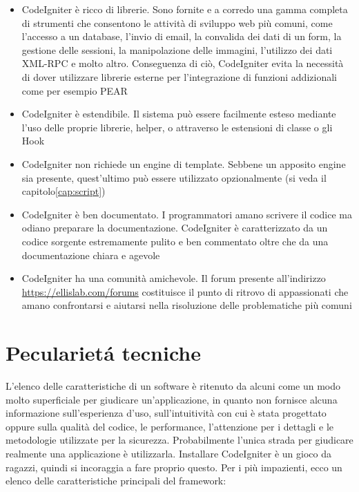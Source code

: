 \begin{itemize}
\item CodeIgniter è ricco di librerie. Sono fornite e a corredo una gamma completa di strumenti che consentono le attività di sviluppo web più comuni, come l'accesso a un database, l'invio di email, la convalida dei dati di un form, la gestione delle sessioni, la manipolazione delle immagini, l'utilizzo dei dati \ac{XML-RPC} e molto altro. Conseguenza di ciò, CodeIgniter evita la necessità di dover utilizzare librerie esterne per l'integrazione di funzioni addizionali come per esempio \ac{PEAR}
\item CodeIgniter è estendibile. Il sistema può essere facilmente esteso mediante l'uso delle proprie librerie, helper, o attraverso le estensioni di classe o gli Hook
\item CodeIgniter non richiede un engine di template. Sebbene un apposito engine sia presente, quest'ultimo può essere utilizzato opzionalmente (si veda il capitolo\vref{cap:script})
\item CodeIgniter è ben documentato. I programmatori amano scrivere il codice ma odiano preparare la documentazione. CodeIgniter è caratterizzato da un codice sorgente estremamente pulito e ben commentato oltre che da una documentazione chiara e agevole
\item CodeIgniter ha una comunità amichevole. Il forum presente all'indirizzo \url{https://ellislab.com/forums} costituisce il punto di ritrovo di appassionati che amano confrontarsi e aiutarsi nella risoluzione delle problematiche più comuni
\end{itemize}


\section*{Peculariet\'a tecniche}
L'elenco delle caratteristiche di un software è ritenuto da alcuni come un modo molto superficiale per giudicare un'applicazione, in quanto non fornisce alcuna informazione sull'esperienza d'uso, sull'intuitività con cui è stata progettato oppure sulla qualità del codice, le performance, l'attenzione per i dettagli e le metodologie utilizzate per la sicurezza. Probabilmente l'unica strada per giudicare realmente una applicazione è utilizzarla. Installare CodeIgniter è un gioco da ragazzi, quindi si incoraggia a fare proprio questo. Per i più impazienti, ecco un elenco delle caratteristiche principali del framework:

